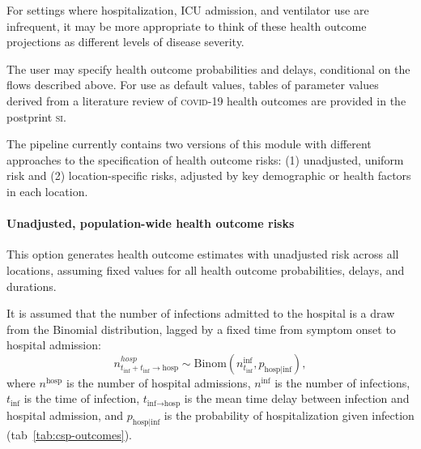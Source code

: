 {For settings where hospitalization, ICU admission, and ventilator use are infrequent, it may be more appropriate to think of these health outcome projections as different levels of disease severity.

The user may specify health outcome probabilities and delays, conditional on the flows described above. For use as default values, tables of parameter values derived from a literature review of \textsc{covid}-19 health outcomes are provided in the postprint \textsc{si}.

The pipeline currently contains two versions of this module with different approaches to the specification of health outcome risks: (1) unadjusted, uniform risk and (2) location-specific risks, adjusted by key demographic or health factors in each location.

\paragraph{Unadjusted, population-wide health outcome risks}
This option generates health outcome estimates with unadjusted risk across all locations, assuming fixed values for all health outcome probabilities, delays, and durations.

It is assumed that the number of infections admitted to the hospital is a draw from the Binomial distribution, lagged by a fixed time from symptom onset to hospital admission:
\begin{equation}
n_{t_\text{inf} + t_\text{inf} \to \text{hosp}}^{hosp} \sim \text{Binom}\left(n_{t_\text{inf}}^\text{inf}, p_{\text{hosp}\mid \text{inf}} \right),
\end{equation}
where $n^\text{hosp}$ is the number of hospital admissions, $n^\text{inf}$ is the number of infections, $t_\text{inf}$ is the time of infection, $t_{\text{inf} \to \text{hosp}}$ is the mean time delay between infection and hospital admission, and $p_{\text{hosp} \mid \text{inf}}$ is the probability of hospitalization given infection (tab~\ref{tab:csp-outcomes}).

}
